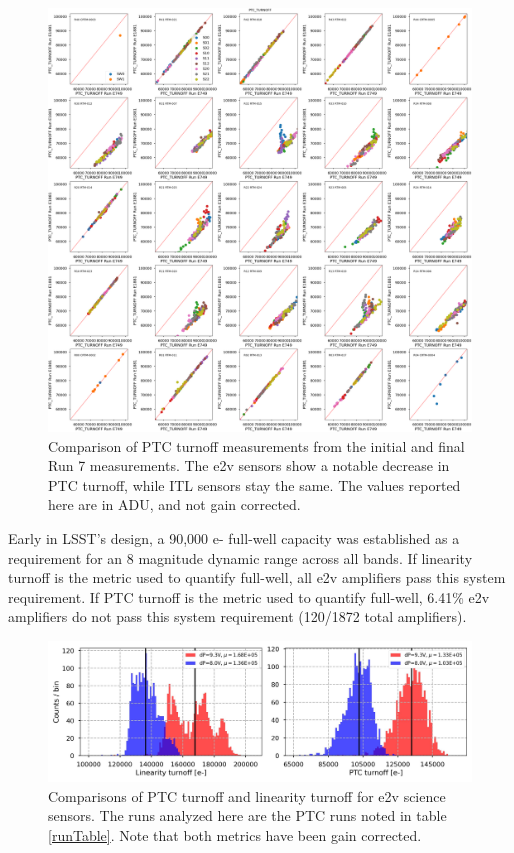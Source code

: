 \begin{figure}
    \centering
    \includegraphics[width=0.7\linewidth]{figures/finalCharacterization/E749_E1881_PTC_TURNOFF.png}
    \caption{Comparison of PTC turnoff measurements from the initial and final Run 7 measurements. The e2v sensors show a notable decrease in PTC turnoff, while ITL sensors stay the same. The values reported here are in ADU, and not gain corrected.}
    \label{fig:finalChar-PTCTurnoff-5x5}
\end{figure}


Early in LSST's design, a 90,000 e- full-well capacity was established as a requirement for an 8 magnitude dynamic range across all bands. If linearity turnoff is the metric used to quantify full-well, all e2v amplifiers pass this system requirement. If PTC turnoff is the metric used to quantify full-well, 6.41\% e2v amplifiers do not pass this system requirement (120/1872 total amplifiers). 

\begin{figure}
    \centering
    \includegraphics[width=0.7\linewidth]{figures/finalCharacterization/fullWellComparisons.jpg}
    \caption{Comparisons of PTC turnoff and linearity turnoff for e2v science sensors. The runs analyzed here are the PTC runs noted in table \ref{runTable}. Note that both metrics have been gain corrected.}
    \label{fig:finalChar-fullWell}
\end{figure}



